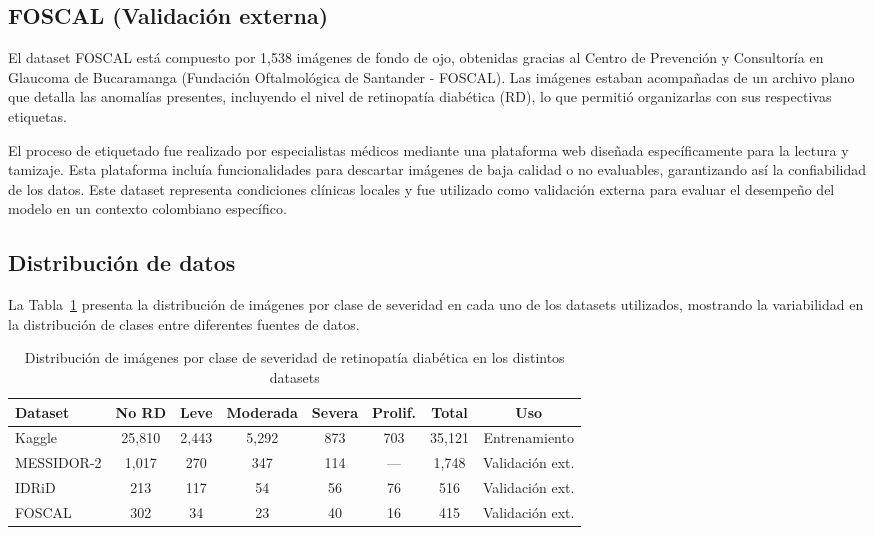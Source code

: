 \subsection{FOSCAL (Validación externa)}

El dataset FOSCAL está compuesto por 1,538 imágenes de fondo de ojo, obtenidas gracias al Centro de Prevención y Consultoría en Glaucoma de Bucaramanga (Fundación Oftalmológica de Santander - FOSCAL). Las imágenes estaban acompañadas de un archivo plano que detalla las anomalías presentes, incluyendo el nivel de retinopatía diabética (RD), lo que permitió organizarlas con sus respectivas etiquetas.

El proceso de etiquetado fue realizado por especialistas médicos mediante una plataforma web diseñada específicamente para la lectura y tamizaje. Esta plataforma incluía funcionalidades para descartar imágenes de baja calidad o no evaluables, garantizando así la confiabilidad de los datos. Este dataset representa condiciones clínicas locales y fue utilizado como validación externa para evaluar el desempeño del modelo en un contexto colombiano específico.

\subsection{Distribución de datos}

La Tabla~\ref{tab:distribucion_clases} presenta la distribución de imágenes por clase de severidad en cada uno de los datasets utilizados, mostrando la variabilidad en la distribución de clases entre diferentes fuentes de datos.

\begin{table}[H]
	\centering
	\renewcommand{\arraystretch}{1.5}
	\caption{Distribución de imágenes por clase de severidad de retinopatía diabética en los distintos datasets}
	\label{tab:distribucion_clases}
	\begin{tabularx}{\textwidth}{X c c c c c c c}
		\hline
		\textbf{Dataset} & \textbf{No RD} & \textbf{Leve} & \textbf{Moderada} & \textbf{Severa} & \textbf{Prolif.} & \textbf{Total} & \textbf{Uso} \\
		\hline
		Kaggle & 25,810 & 2,443 & 5,292 & 873 & 703 & 35,121 & Entrenamiento \\
		MESSIDOR-2 & 1,017 & 270 & 347 & 114 & --- & 1,748 & Validación ext. \\
		IDRiD & 213 & 117 & 54 & 56 & 76 & 516 & Validación ext. \\
		FOSCAL & 302 & 34 & 23 & 40 & 16 & 415 & Validación ext. \\
		\hline
	\end{tabularx}
\end{table}

